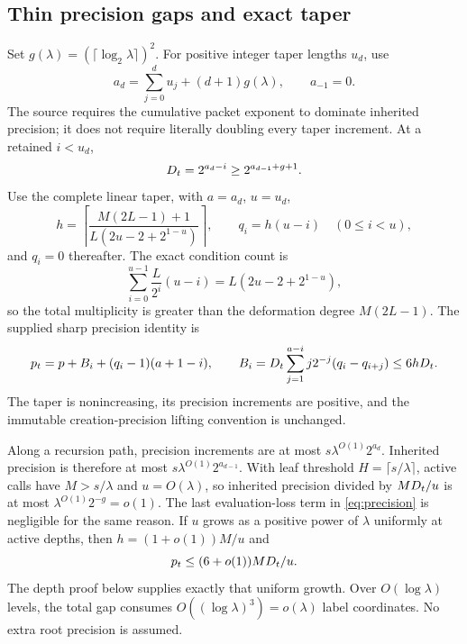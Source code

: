 \subsection{Thin precision gaps and exact taper}
Set $g(\lambda)=(\lceil\log_2\lambda\rceil)^2$. For positive integer taper lengths $u_d$, use
\begin{equation}\label{eq:thin}
 a_d=\sum_{j=0}^d u_j+(d+1)g(\lambda),\qquad a_{-1}=0.
\end{equation}
The source requires the cumulative packet exponent to dominate inherited precision;
it does not require literally doubling every taper increment.
At a retained $i<u_d$,
\[
 D_t=2^{a_d-i}\ge2^{a_{d-1}+g+1}.
\]
Use the complete linear taper, with $a=a_d$, $u=u_d$,
\begin{equation}\label{eq:taper}
 h=\left\lceil\frac{M(2L-1)+1}{L(2u-2+2^{1-u})}\right\rceil,
 \qquad q_i=h(u-i)\quad(0\le i<u),
\end{equation}
and $q_i=0$ thereafter. The exact condition count is
\[
 \sum_{i=0}^{u-1}\frac{L}{2^i}(u-i)=L(2u-2+2^{1-u}),
\]
so the total multiplicity is greater than the deformation degree $M(2L-1)$.
The supplied sharp precision identity is
\begin{equation}\label{eq:precision}
 p_t=p+B_i+(q_i-1)(a+1-i),\qquad
 B_i=D_t\sum_{j=1}^{a-i}j2^{-j}(q_i-q_{i+j})\le6hD_t.
\end{equation}
The taper is nonincreasing, its precision increments are positive, and the immutable
creation-precision lifting convention is unchanged.

Along a recursion path, precision increments are at most
$s\lambda^{O(1)}2^{a_d}$. Inherited precision is therefore at most
$s\lambda^{O(1)}2^{a_{d-1}}$. With leaf threshold $H=\lceil s/\lambda\rceil$,
active calls have $M>s/\lambda$ and $u=O(\lambda)$, so inherited precision divided
by $MD_t/u$ is at most $\lambda^{O(1)}2^{-g}=o(1)$. The last evaluation-loss term
in \eqref{eq:precision} is negligible for the same reason. If $u$ grows as a positive
power of $\lambda$ uniformly at active depths, then
$h=(1+o(1))M/u$ and
\begin{equation}\label{eq:precision6}
 p_t\le(6+o(1))MD_t/u.
\end{equation}
The depth proof below supplies exactly that uniform growth. Over $O(\log\lambda)$ levels,
the total gap consumes $O((\log\lambda)^3)=o(\lambda)$ label coordinates.
No extra root precision is assumed.

